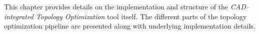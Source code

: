   \vspace{1mm}

\noindent This chapter provides details on the implementation and structure of the \emph{CAD--integrated Topology Optimization} tool itself. The different parts of the topology optimization pipeline are presented along with underlying implementation details.
\\